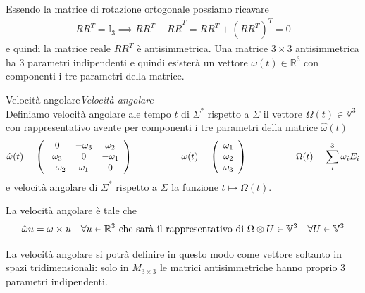 \documentclass[11pt,a4paper,twoside]{book}
\newenvironment{definizione}[1][\empty]{\begin{Definizione}{
\ifx\empty#1\relax\else\mdseries\itshape#1\\\fi
}{}}{\end{Definizione}}
\theoremstyle{esss}
\theoremstyle{dotless}
\numberwithin{equation}{section} %
\begin{document}
Essendo la matrice di rotazione ortogonale possiamo ricavare
\begin{align*}
RR^T=\mathbb{I}_3 \implies \dot{R} R^T +R\dot{R}^T = \dot{R}R^T+\left(\dot{R}R^T\right)^T=0 
\end{align*}
e quindi la matrice reale $\dot{R}R^T$ è antisimmetrica. Una matrice $3\times 3$ antisimmetrica ha $3$ parametri indipendenti e quindi esisterà un vettore $\omega(t)\in\mathbb{R}^3$ con componenti i tre parametri della matrice.

\begin{definizione}[Velocità angolare]
Definiamo velocità angolare ale tempo $t$ di $\Sigma^*$ rispetto a $\Sigma$ il vettore $\Omega(t)\in\mathbb{V}^3$ con rappresentativo avente per componenti i tre parametri della matrice $\hat{\omega}(t)$ 
\[
\hat{\omega}(t)=\left(\begin{array}{ccc}
0 & -\omega_{3} & \omega_{2} \\
\omega_{3} & 0 & -\omega_{1} \\
-\omega_{2} & \omega_{1} & 0
\end{array}\right) 
\hspace{0.15\linewidth}
\omega(t)=\left(\begin{array}{c}
\omega_1 \\ \omega_2 \\ \omega_3 
\end{array}\right) \hspace{0.15\linewidth}
\Omega(t)=\sum_i^3 \omega_i E_i
\]
e velocità angolare di $\Sigma^*$ rispetto a $\Sigma$ la funzione $t\mapsto \Omega(t)$.

La velocità angolare è tale che
\[
\hat{\omega}u=\omega \times u \quad \forall u\in\mathbb{R}^3 \text{ che sarà il rappresentativo di } \Omega\otimes U \in\mathbb{V}^3 \quad \forall U\in\mathbb{V}^3
\]
\end{definizione}

La velocità angolare si potrà definire in questo modo come vettore soltanto in spazi tridimensionali: solo in $M_{3\times 3}$ le matrici antisimmetriche hanno proprio $3$ parametri indipendenti.
\end{document}
